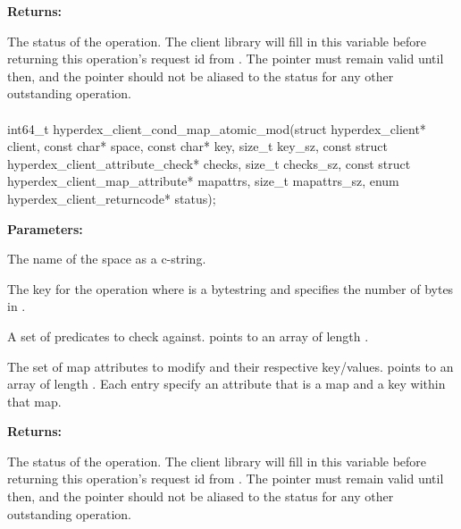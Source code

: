 \noindent\textbf{Returns:}
\begin{description}[labelindent=\widthof{{\code{status}}},leftmargin=*,noitemsep,nolistsep,align=right]
\item[\code{status}] The status of the operation.  The client library will fill in this variable before returning this operation's request id from .  The pointer must remain valid until then, and the pointer should not be aliased to the status for any other outstanding operation.
\end{description}

\paragraph{}
\label{api:c:cond_map_atomic_mod}
\begin{ccode}
int64_t hyperdex_client_cond_map_atomic_mod(struct hyperdex_client* client,
                const char* space,
                const char* key, size_t key_sz,
                const struct hyperdex_client_attribute_check* checks, size_t checks_sz,
                const struct hyperdex_client_map_attribute* mapattrs, size_t mapattrs_sz,
                enum hyperdex_client_returncode* status);
\end{ccode}
\funcdesc 

\noindent\textbf{Parameters:}
\begin{description}[labelindent=\widthof{{\code{mapattrs}, \code{mapattrs\_sz}}},leftmargin=*,noitemsep,nolistsep,align=right]
\item[\code{space}] The name of the space as a c-string.
\item[\code{key}, \code{key\_sz}] The key for the operation where  is a bytestring and  specifies the number of bytes in .
\item[\code{checks}, \code{checks\_sz}] A set of predicates to check against.   points to an array of length .
\item[\code{mapattrs}, \code{mapattrs\_sz}] The set of map attributes to modify and their respective key/values.   points to an array of length .  Each entry specify an attribute that is a map and a key within that map.
\end{description}

\noindent\textbf{Returns:}
\begin{description}[labelindent=\widthof{{\code{status}}},leftmargin=*,noitemsep,nolistsep,align=right]
\item[\code{status}] The status of the operation.  The client library will fill in this variable before returning this operation's request id from .  The pointer must remain valid until then, and the pointer should not be aliased to the status for any other outstanding operation.
\end{description}


